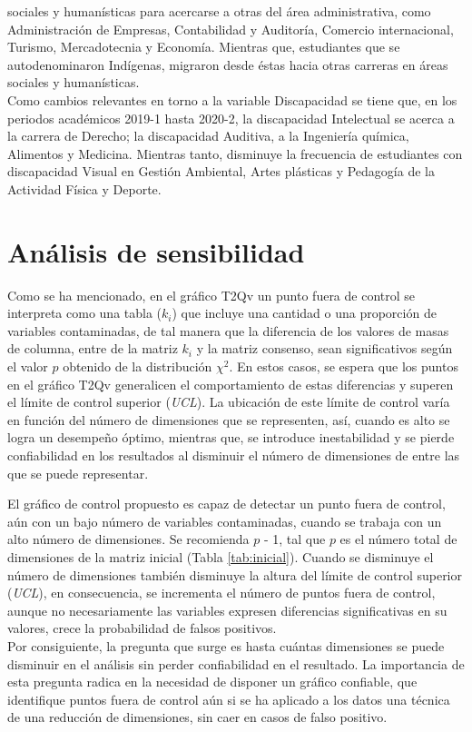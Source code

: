 \documentclass[water,article,submit,moreauthors,pdftex]{mdpi}
\begin{document}
sociales y humanísticas para acercarse a otras del área administrativa,
como Administración de Empresas, Contabilidad y Auditoría, Comercio
internacional, Turismo, Mercadotecnia y Economía. Mientras que,
estudiantes que se autodenominaron Indígenas, migraron desde éstas hacia
otras carreras en áreas sociales y humanísticas.\\
Como cambios relevantes en torno a la variable Discapacidad se tiene
que, en los periodos académicos 2019-1 hasta 2020-2, la discapacidad
Intelectual se acerca a la carrera de Derecho; la discapacidad Auditiva,
a la Ingeniería química, Alimentos y Medicina. Mientras tanto, disminuye
la frecuencia de estudiantes con discapacidad Visual en Gestión
Ambiental, Artes plásticas y Pedagogía de la Actividad Física y Deporte.

\hypertarget{anuxe1lisis-de-sensibilidad}{%
\section{Análisis de sensibilidad}\label{anuxe1lisis-de-sensibilidad}}

Como se ha mencionado, en el gráfico T2Qv un punto fuera de control se
interpreta como una tabla (\(k_i\)) que incluye una cantidad o una
proporción de variables contaminadas, de tal manera que la diferencia de
los valores de masas de columna, entre de la matriz \(k_i\) y la matriz
consenso, sean significativos según el valor \(p\) obtenido de la
distribución \(\chi^2\). En estos casos, se espera que los puntos en el
gráfico T2Qv generalicen el comportamiento de estas diferencias y
superen el límite de control superior (\emph{UCL}). La ubicación de este
límite de control varía en función del número de dimensiones que se
representen, así, cuando es alto se logra un desempeño óptimo, mientras
que, se introduce inestabilidad y se pierde confiabilidad en los
resultados al disminuir el número de dimensiones de entre las que se
puede representar.

El gráfico de control propuesto es capaz de detectar un punto fuera de
control, aún con un bajo número de variables contaminadas, cuando se
trabaja con un alto número de dimensiones. Se recomienda \(p\) - 1, tal
que \(p\) es el número total de dimensiones de la matriz inicial (Tabla
\ref{tab:inicial}). Cuando se disminuye el número de dimensiones también
disminuye la altura del límite de control superior (\emph{UCL}), en
consecuencia, se incrementa el número de puntos fuera de control, aunque
no necesariamente las variables expresen diferencias significativas en
su valores, crece la probabilidad de falsos positivos.\\
Por consiguiente, la pregunta que surge es hasta cuántas dimensiones se
puede disminuir en el análisis sin perder confiabilidad en el resultado.
La importancia de esta pregunta radica en la necesidad de disponer un
gráfico confiable, que identifique puntos fuera de control aún si se ha
aplicado a los datos una técnica de una reducción de dimensiones, sin
caer en casos de falso positivo.
\end{document}

